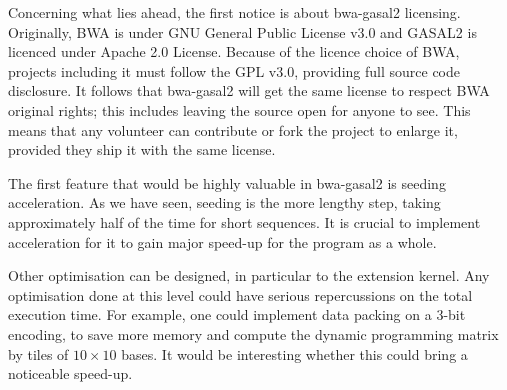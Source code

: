 Concerning what lies ahead, the first notice is about bwa-gasal2 licensing. Originally, BWA is under GNU General Public License v3.0 and GASAL2 is licenced under Apache 2.0 License. Because of the licence choice of BWA, projects including it must follow the GPL v3.0, providing full source code disclosure. It follows that bwa-gasal2 will get the same license to respect BWA original rights; this includes leaving the source open for anyone to see. This means that any volunteer can contribute or fork the project to enlarge it, provided they ship it with the same license.

The first feature that would be highly valuable in bwa-gasal2 is seeding acceleration. As we have seen, seeding is the more lengthy step, taking approximately half of the time for short sequences. It is crucial to implement acceleration for it to gain major speed-up for the program as a whole. 

Other optimisation can be designed, in particular to the extension kernel. Any optimisation done at this level could have serious repercussions on the total execution time. For example, one could implement data packing on a 3-bit encoding, to save more memory and compute the dynamic programming matrix by tiles of $10 \times 10$ bases. It would be interesting whether this could bring a noticeable speed-up.